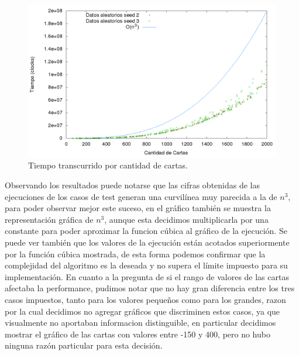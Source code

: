 \begin{figure}[h]
\begin{center}
\includegraphics[scale=0.4]{./img/ej1_chart.png}
\caption{Tiempo transcurrido por cantidad de cartas.}
\end{center}
\end{figure}

Observando los resultados puede notarse que las cifras obtenidas de las ejecuciones de los casos de test generan una curvil\'inea muy parecida a la de $n^3$, para poder observar mejor este suceso, en el gr\'afico tambi\'en se muestra la representaci\'on gr\'afica de $n^3$, aunque esta decidimos multiplicarla por una constante para poder aproximar la funcion c\'ubica al gr\'afico de la ejecuci\'on.
Se puede ver tambi\'en que los valores de la ejecuci\'on est\'an acotados superiormente por la funci\'on c\'ubica mostrada, de esta forma podemos confirmar que la complejidad del algoritmo es la deseada y no supera el l\'imite impuesto para su implementaci\'on.
En cuanto a la pregunta de si el rango de valores de las cartas afectaba la performance, pudimos notar que no hay gran diferencia entre los tres casos impuestos, tanto para los valores peque\~nos como para los grandes, razon por la cual decidimos no agregar gr\'aficos que discriminen estos casos, ya que visualmente no aportaban informacion distinguible, en particular decidimos mostrar el gr\'afico de las cartas con valores entre -150 y 400, pero no hubo ninguna raz\'on particular para esta decisi\'on.
